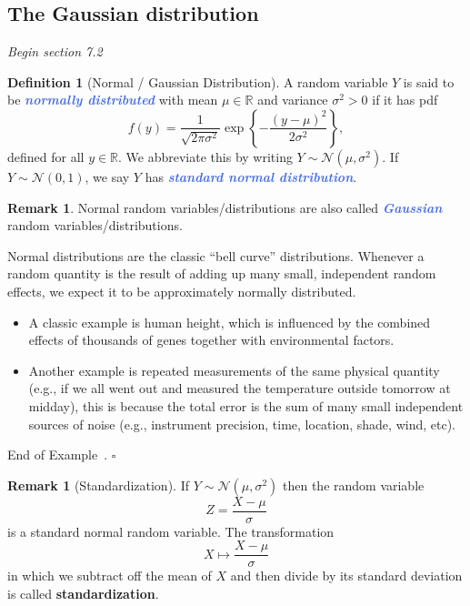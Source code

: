 \documentclass[10pt]{article}
\theoremstyle{definition}
\newtheorem{definition}[theorem]{Definition}
\newtheorem{remark}[theorem]{Remark}
\newtheorem{example}[theorem]{Example}
\renewenvironment{example}
{\begin{oldexample}}
  {\par\smallskip\hfill   End of Example~\theexample. $\square$    \par\end{oldexample}}
\newcommand{\1}[1]{\textbf{1}_{\left[#1\right]}} %
\def\R{\mathbb{R}} %
\newcommand{\demph}[1]{\textcolor{RoyalBlue}{\textbf{\slshape #1}}} %
\begin{document}
\subsection{The Gaussian distribution}
\textit{Begin section 7.2}

\begin{definition}[Normal / Gaussian Distribution]
  \label{def:gaussian-distribution}
  A random variable $Y$ is said to be \demph{normally distributed} with mean
  $\mu\in \R$ and variance $\sigma^{2}>0$ if it has pdf
  \begin{equation*}
    f(y) = \frac{1}{\sqrt{2\pi\sigma^{2}}} \exp\left\{-\frac{(y-\mu)^{2}}{2\sigma^{2}} \right\},
  \end{equation*}
  defined for all $y\in \R$. We abbreviate this by writing
  $Y\sim \mathcal{N}(\mu,\sigma^{2})$. If $Y\sim \mathcal{N}(0,1)$, we say $Y$
  has \demph{standard normal distribution}.
\end{definition}

\begin{remark}
  Normal random variables/distributions are also called \demph{Gaussian} random variables/distributions.
\end{remark}

\begin{example}
  Normal distributions are the classic ``bell curve'' distributions. Whenever
  a random quantity is the result of adding up many small, independent random
  effects, we expect it to be approximately normally distributed.

  \begin{itemize}
    \item A classic example is human height, which is influenced by the
    combined effects of thousands of genes together with environmental
    factors.
    \item Another example is repeated measurements of the same physical
    quantity (e.g., if we all went out and measured the temperature outside
    tomorrow at midday), this is because the total error is the sum of many
    small independent sources of noise (e.g., instrument precision, time,
    location, shade, wind, etc).
  \end{itemize}
\end{example}


\begin{remark}[Standardization]
  \label{rmk:standardization}
  If $Y \sim \mathcal{N}(\mu,\sigma^{2})$ then the random
  variable
  \begin{equation*}
    Z = \frac{X-\mu}{\sigma}
  \end{equation*}
  is a standard normal random variable. The transformation
  \begin{equation*}
    X \mapsto \frac{X-\mu}{\sigma}
  \end{equation*}
  in which we subtract off the mean of $X$ and then divide by its standard
  deviation is called \textbf{standardization}.
\end{remark}
\end{document}
